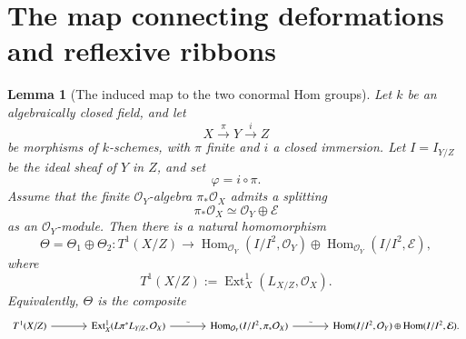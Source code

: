 \documentclass[11pt,twoside]{amsart}
\theoremstyle{plain}
\numberwithin{equation}{section}
\newtheorem{lemma}[theorem]{Lemma}
\theoremstyle{definition}
\begin{document}
\section{The map connecting deformations and reflexive ribbons}

\begin{lemma}[The induced map to the two conormal Hom groups]
\label{lem:T1-map-to-conormal-Hom}
Let \(k\) be an algebraically closed field, and let
\[
    X \xrightarrow{\pi} Y \xrightarrow{i} Z
\]
be morphisms of \(k\)-schemes, with \(\pi\) finite and \(i\) a closed immersion.
Let \(I=I_{Y/Z}\) be the ideal sheaf of \(Y\) in \(Z\), and set
\[
    \varphi=i\circ \pi.
\]
Assume that the finite \(\mathcal O_Y\)-algebra \(\pi_*\mathcal O_X\) admits a splitting
\[
    \pi_*\mathcal O_X \simeq \mathcal O_Y\oplus \mathcal E
\]
as an \(\mathcal O_Y\)-module. Then there is a natural homomorphism
\[
    \Theta=\Theta_1\oplus \Theta_2:
    T^1(X/Z)
    \longrightarrow
    \operatorname{Hom}_{\mathcal O_Y}(I/I^2,\mathcal O_Y)
    \oplus
    \operatorname{Hom}_{\mathcal O_Y}(I/I^2,\mathcal E),
\]
where
\[
    T^1(X/Z):=\operatorname{Ext}^1_X(L_{X/Z},\mathcal O_X).
\]
Equivalently, \(\Theta\) is the composite
\[
\begin{tikzcd}[column sep=large]
    T^1(X/Z)
    \arrow[r]
    &
    \operatorname{Ext}^1_X(L\pi^*L_{Y/Z},\mathcal O_X)
    \arrow[r,"\sim"]
    &
    \operatorname{Hom}_{\mathcal O_Y}(I/I^2,\pi_*\mathcal O_X)
    \arrow[r,"\sim"]
    &
    \operatorname{Hom}(I/I^2,\mathcal O_Y)
    \oplus
    \operatorname{Hom}(I/I^2,\mathcal E).
\end{tikzcd}
\]
\end{lemma}
\end{document}
